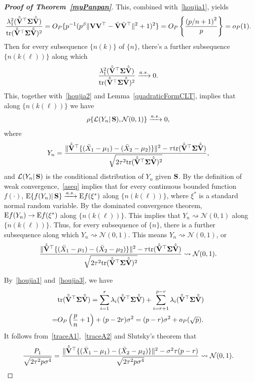 \documentclass[times,sort&compress,3p]{elsarticle}
\newcommand{\mytr}{ {\rm tr} }
\newcommand{\myE}{ {\rm E} }
\theoremstyle{plain}
\theoremstyle{definition}
\theoremstyle{remark}
\begin{document}
\begin{appendices}
\begin{proof}[\textbf{Proof of Theorem~\ref{myPanpan}}]
This, combined with~\eqref{houjia1}, yields
$$
\frac{\lambda_1^2(\hat{\tilde{\BV}}^\top \bSigma\hat{\tilde{\BV}})}{\mytr(\hat{\tilde{\BV}}^\top \bSigma\hat{\tilde{\BV}})^2}
=O_P\{p^{-1}(p^{\beta}\|\BV\BV^\top -\hat{\BV}\hat{\BV}^\top \|^2+1)^2\}
=O_P\left\{\frac{{(p/n+1)}^2}{p}\right\}=o_P(1).
$$
Then for every subsequence $\{n(k)\}$ of $\{n\}$, there's a further subsequence $\{n(k(\ell))\}$ along which
$$
\frac{\lambda_1^2(\hat{\tilde{\BV}}^\top \bSigma\hat{\tilde{\BV}})}{\mytr(\hat{\tilde{\BV}}^\top \bSigma\hat{\tilde{\BV}})^2}\xrightarrow{a.s.}0.
$$
This, together with~\eqref{houjia2} and Lemma~\ref{quadraticFormCLT}, implies that along $\{n(k(\ell))\}$ we have
\begin{equation}\label{aseq}
    \rho\{\mathcal{L}( Y_n |\,\mathbf{S}),\mathcal{N}(0,1)\}\xrightarrow{a.s.}0,
\end{equation}
where 
$$
Y_n=\frac{\|\hat{\tilde{\mathbf{V}}}^\top \{(\bar{X}_1-\mu_1)-(\bar{X}_2-\mu_2)\}\|^2-\tau\mathrm{tr}(\hat{\tilde{\mathbf{V}}}^\top \boldsymbol{\Sigma}\hat{\tilde{\mathbf{V}}})}{\sqrt{2\tau^2\mathrm{tr}(\hat{\tilde{\mathbf{V}}}^\top \boldsymbol{\Sigma}\hat{\tilde{\mathbf{V}}})^2}},
$$
and $\mathcal{L}(Y_n|\,\mathbf{S})$ is the conditional distribution of $Y_n$ given $\mathbf{S}$.
By the definition of weak convergence,~\eqref{aseq} implies that for every continuous bounded function $f(\cdot)$, $\myE\{f(Y_n)|\,\BS\}\xrightarrow{a.s.}\myE f(\xi^*)$ along $\{n(k(\ell))\}$, where $\xi^*$ is a standard normal random variable.
By the dominated convergence theorem, $\myE f(Y_n)\to \myE f(\xi^*)$ along $\{n(k(\ell))\}$.
This implies that $Y_n\rightsquigarrow \mathcal{N}(0,1)$ along $\{n(k(\ell))\}$.
Thus, for every subsequence of $\{n\}$, there is a further subsequence along which
$Y_n\rightsquigarrow \mathcal{N}(0,1)$.
This means $Y_n\rightsquigarrow \mathcal{N}(0,1)$, or
$$
\frac{\|\hat{\tilde{\mathbf{V}}}^\top \{(\bar{X}_1-\mu_1)-(\bar{X}_2-\mu_2)\}\|^2-\tau\mathrm{tr}(\hat{\tilde{\mathbf{V}}}^\top \boldsymbol{\Sigma}\hat{\tilde{\mathbf{V}}})}{\sqrt{2\tau^2\mathrm{tr}(\hat{\tilde{\mathbf{V}}}^\top \boldsymbol{\Sigma}\hat{\tilde{\mathbf{V}}})^2}}\rightsquigarrow \mathcal{N}(0,1).
$$


By~\eqref{houjia1} and~\eqref{houjia3}, we have
\begin{equation}\label{traceA2}
    \begin{aligned}
        &\mytr(\hat{\tilde{\BV}}^\top \bSigma\hat{\tilde{\BV}})=
    \sum_{i=1}^r \lambda_i(\hat{\tilde{\BV}}^\top \bSigma\hat{\tilde{\BV}})
    +
    \sum_{i=r+1}^{p-r} \lambda_i(\hat{\tilde{\BV}}^\top \bSigma\hat{\tilde{\BV}})\\
        =&
    O_P\left(\frac{p}{n}+1\right)+(p-2r)\sigma^2
        =
        (p-r)\sigma^2+o_P(\sqrt{p}).
    \end{aligned}
\end{equation}
It follows from~\eqref{traceA1},~\eqref{traceA2} and Slutsky's theorem that
$$
\frac{P_1}{\sqrt{2\tau^2 p\sigma^4}}=
\frac{\|\hat{\tilde{\mathbf{V}}}^\top \{(\bar{X}_1-\mu_1)-(\bar{X}_2-\mu_2)\}\|^2-\sigma^2\tau(p-r) }{\sqrt{2\tau^2 p\sigma^4}}\rightsquigarrow \mathcal{N}(0,1).
$$


\end{proof}
\end{appendices}
\end{document}
